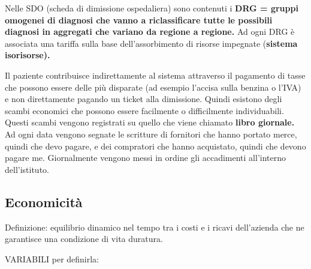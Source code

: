 Nelle SDO (scheda di dimissione ospedaliera) sono contenuti i
\textbf{DRG = gruppi omogenei di diagnosi che vanno a riclassificare tutte le possibili diagnosi in aggregati che variano da regione a regione.} Ad ogni DRG è associata una tariffa sulla base dell'assorbimento di risorse impegnate (\textbf{sistema isorisorse).}

Il paziente contribuisce indirettamente al sistema attraverso il pagamento di tasse che possono essere delle più disparate (ad esempio l'accisa sulla benzina o l'IVA) e non direttamente pagando un ticket alla dimissione. Quindi esistono degli scambi economici che possono essere facilmente o difficilmente individuabili. Questi scambi vengono registrati su quello che viene chiamato \textbf{libro giornale.} Ad ogni data vengono segnate le scritture di fornitori che hanno portato merce, quindi che devo pagare, e dei compratori che hanno acquistato, quindi che devono pagare me. Giornalmente vengono messi in ordine gli accadimenti all'interno dell'istituto.

\subsection{Economicità}

Definizione: equilibrio dinamico nel tempo tra i costi e i ricavi dell'azienda che ne garantisce una condizione di vita duratura.

VARIABILI per definirla:

